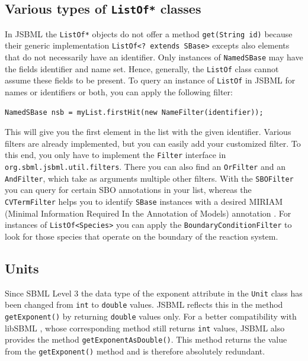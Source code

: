 \documentclass[
  BCOR12mm,
  letterpaper,
  11pt,
  headsepline,
  pointlessnumbers,
  tablecaptionabove,
  onelinecaption,
  headinclude,
  appendixprefix,
  idxtotoc,
  bibtotoc,
  twoside,
  titlepage
]{scrartcl}
\begin{document}
\subsection{Various types of \texttt{ListOf*} classes}

In JSBML the \texttt{ListOf*}
objects do not offer a method
\texttt{get(String id)} because their generic implementation 
\texttt{ListOf<? extends SBase>} excepts also elements that do
not necessarily have an identifier. Only instances of \texttt{NamedSBase} may have
the fields identifier and name set. Hence, generally, the \texttt{ListOf} class
cannot assume these fields to be present. To query an instance of \texttt{ListOf}
in JSBML for names or identifiers or both, you can apply the following filter:
\begin{lstlisting}
NamedSBase nsb = myList.firstHit(new NameFilter(identifier));
\end{lstlisting}
This will give you the first element in the list with the given identifier.
Various filters are already implemented, but you can easily add your 
customized filter. To this end, you only have to implement the \texttt{Filter}
interface in \texttt{org.sbml.jsbml.util.filters}. There you can also find an
\texttt{OrFilter} and an \texttt{AndFilter}, which take as arguments multiple other
filters. With the \texttt{SBOFilter} you can query for certain SBO  annotations \citep{Novere2006,Novere2006b} in
your list, whereas the \texttt{CVTermFilter} helps you to identify \texttt{SBase}
instances with a desired MIRIAM (Minimal Information Required In the Annotation of Models) annotation \citep{Novere2005}. For instances of
\texttt{ListOf<Species>} you can apply the \texttt{BoundaryConditionFilter} to look
for those species that operate on the boundary of the reaction system.


\subsection{Units}

Since SBML Level 3 \citep{Hucka2010a} the data type of the exponent attribute in the \texttt{Unit}
class has been changed from \texttt{int} to \texttt{double} values.
JSBML
reflects this in the method \texttt{getExponent()} by returning \texttt{double}
values only. For a better compatibility with libSBML
,
whose corresponding method still
returns \texttt{int} values, JSBML also provides the method
\texttt{getExponentAsDouble()}. This method returns the value from the
\texttt{getExponent()} method and is therefore absolutely redundant.
\end{document}
